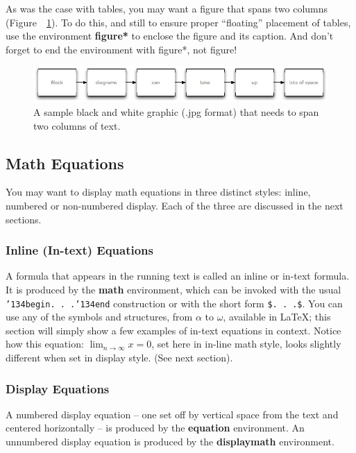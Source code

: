 \documentclass{nime-alternate} %
\begin{document}
As was the case with tables, you may want a figure that spans two columns (Figure~~\ref{fig:BlockDiagram2}). To do this, and still to ensure proper ``floating'' placement of tables, use the environment \textbf{figure*} to enclose the figure and its caption. And don't forget to end the environment with {figure*}, not {figure}!

\begin{figure}[htbp]
	\centering
		\includegraphics[width=1\textwidth]{BlockDiagram2}
	\caption{A sample black and white graphic (.jpg format) that needs to span two columns of text.}
	\label{fig:BlockDiagram2}
\end{figure}

\subsection{Math Equations}
You may want to display math equations in three distinct styles:
inline, numbered or non-numbered display.  Each of
the three are discussed in the next sections.

\subsubsection{Inline (In-text) Equations}
A formula that appears in the running text is called an
inline or in-text formula.  It is produced by the
\textbf{math} environment, which can be
invoked with the usual \texttt{{\char'134}begin. . .{\char'134}end}
construction or with the short form \texttt{\$. . .\$}. You
can use any of the symbols and structures,
from $\alpha$ to $\omega$, available in
\LaTeX \cite{Lamport:LaTeX}; this section will simply show a
few examples of in-text equations in context. Notice how
this equation: \begin{math}\lim_{n\rightarrow \infty}x=0\end{math},
set here in in-line math style, looks slightly different when
set in display style.  (See next section).

\subsubsection{Display Equations}
A numbered display equation -- one set off by vertical space
from the text and centered horizontally -- is produced
by the \textbf{equation} environment. An unnumbered display
equation is produced by the \textbf{displaymath} environment.
\end{document}
